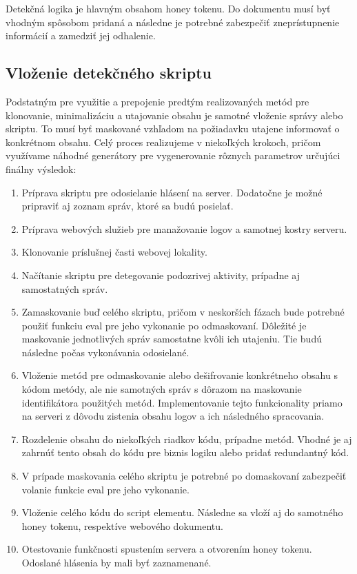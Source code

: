 \documentclass[conference, 11pt,slovak,a4paper,twoside]{IEEEtran}
\begin{document}
Detekčná logika je hlavným obsahom honey tokenu. Do dokumentu musí byť vhodným spôsobom pridaná a následne je potrebné zabezpečiť zneprístupnenie informácií a zamedziť jej odhalenie.


\subsection{Vloženie detekčného skriptu}

Podstatným pre využitie a prepojenie predtým realizovaných metód pre klonovanie, minimalizáciu a utajovanie obsahu je samotné vloženie správy alebo skriptu. To musí byť maskované vzhľadom na požiadavku utajene informovať o konkrétnom obsahu. Celý proces realizujeme v niekoľkých krokoch, pričom využívame náhodné generátory pre vygenerovanie rôznych parametrov určujúci finálny výsledok:


\begin{enumerate}
	\item Príprava skriptu pre odosielanie hlásení na server. Dodatočne je možné pripraviť aj zoznam správ, ktoré sa budú posielať.

	\item Príprava webových služieb pre manažovanie logov a samotnej kostry serveru.
	
	\item Klonovanie príslušnej časti webovej lokality.
	
	\item Načítanie skriptu pre detegovanie podozrivej aktivity, prípadne aj samostatných správ. 
	
	\item Zamaskovanie buď celého skriptu, pričom v neskorších fázach bude potrebné použiť funkciu eval pre jeho vykonanie po odmaskovaní. Dôležité je maskovanie jednotlivých správ samostatne kvôli ich utajeniu. Tie budú následne počas vykonávania odosielané. 
	
	\item Vloženie metód pre odmaskovanie alebo dešifrovanie konkrétneho obsahu s kódom metódy, ale nie samotných správ s dôrazom na maskovanie identifikátora použitých metód. Implementovanie tejto funkcionality priamo na serveri z dôvodu zistenia obsahu logov a ich následného spracovania.
	
	\item Rozdelenie obsahu do niekoľkých riadkov kódu, prípadne metód. Vhodné je aj zahrnúť tento obsah do kódu pre biznis logiku alebo pridať redundantný kód.
	
	\item V prípade maskovania celého skriptu je potrebné po domaskovaní zabezpečiť volanie funkcie eval pre jeho vykonanie.
	
	\item Vloženie celého kódu do script elementu. Následne sa vloží aj do samotného honey tokenu, respektíve webového dokumentu.
	
	\item Otestovanie funkčnosti spustením servera a otvorením honey tokenu. Odoslané hlásenia by mali byť zaznamenané.
\end{enumerate}
\end{document}
